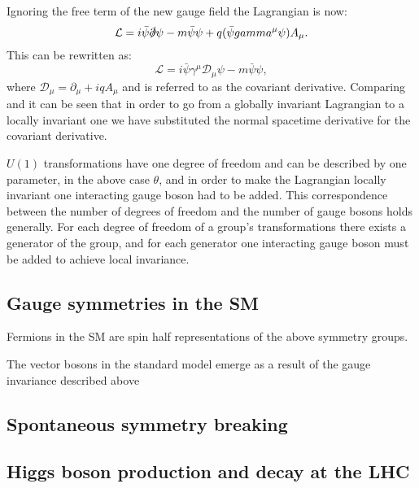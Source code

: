 Ignoring the free term of the new gauge field the Lagrangian is now:
\begin{equation}
  \mathcal{L}=i\bar{\psi}\slashed{\partial}\psi-m\bar{\psi}\psi+q(\bar{\psi}\gamma^{\mu}\psi) A_{\mu}.
\end{equation}
This can be rewritten as:
\begin{equation}
  \label{eq:localdiraclagrangian}
  \mathcal{L}=i\bar{\psi}\gamma^{\mu}\mathcal{D}_{\mu}\psi-m\bar{\psi}\psi,
\end{equation}
where $\mathcal{D}_{\mu}=\partial_{\mu}+iqA_{\mu}$ and is referred to as the covariant derivative. Comparing  and  it can be seen that in order to go from a globally invariant Lagrangian to a locally invariant one we have substituted the normal spacetime derivative for the covariant derivative.

$U(1)$ transformations have one degree of freedom and can be described by one parameter, in the above case $\theta$, and in order to make the Lagrangian locally invariant one interacting gauge boson had to be added. This correspondence between the number of degrees of freedom and the number of gauge bosons holds generally. For each degree of freedom of a group's transformations there exists a generator of the group, and for each generator one interacting gauge boson must be added to achieve local invariance. 

\subsection{Gauge symmetries in the SM}
Fermions in the SM are spin half representations of the above symmetry groups.

The vector bosons in the standard model emerge as a result of the gauge invariance described above 




\subsection{Spontaneous symmetry breaking}

\subsection{Higgs boson production and decay at the LHC}



